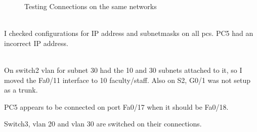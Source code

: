 \documentclass[../EngineeringJournal_CDavis.tex]{subfiles}
\begin{document}
\begin{figure}[!hbt]\centering
{}\par
{}\hfill
{}\par
\caption{Testing Connections on the same networks}\label{Ping11}
\end{figure}





\\
I checked configurations for IP address and subnetmasks on all pcs. 
PC5 had an incorrect IP address.

\noindent{}\\
On switch2 vlan for subnet 30 had the 10 and 30 subnets attached to it, so I
moved the Fa0/11 interface to 10 faculty/staff. Also on S2, G0/1 was not setup
as a trunk.

PC5 appears to be connected on port Fa0/17 when it should be Fa0/18.

Switch3, vlan 20 and vlan 30 are switched on their connections.
\end{document}
